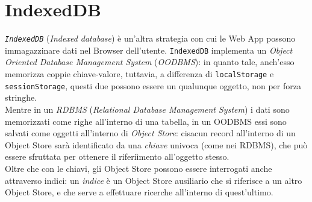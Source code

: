\documentclass[a4paper, 12pt, twoside, openright]{book}
\begin{document}
\section{IndexedDB} %
\textit{\texttt{IndexedDB}} (\textit{Indexed database}) è un'altra strategia con cui le Web App possono immagazzinare dati nel Browser dell'utente. \texttt{IndexedDB} implementa un \textit{Object Oriented Database Management System} (\textit{OODBMS}): in quanto tale, anch'esso memorizza coppie chiave-valore, tuttavia, a differenza di \texttt{localStorage} e \texttt{sessionStorage}, questi due possono essere un qualunque oggetto, non per forza stringhe.\\
Mentre in un \textit{RDBMS} (\textit{Relational Database Management System}) i dati sono memorizzati come righe all'interno di una tabella, in un OODBMS essi sono salvati come oggetti all'interno di \textit{Object Store}: cisacun record all'interno di un Object Store sarà identificato da una \textit{chiave} univoca (come nei RDBMS), che può essere sfruttata per ottenere il riferiìmento all'oggetto stesso.\\
Oltre che con le chiavi, gli Object Store possono essere interrogati anche attraverso indici: un \textit{indice} è un Object Store ausiliario che si riferisce a un altro Object Store, e che serve a effettuare ricerche all'interno di quest'ultimo.
\backmatter

\begingroup %
  \makeatletter
  \let\ps@plain\ps@empty
  \makeatother
  
\endgroup
\end{document}
